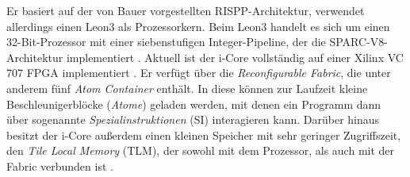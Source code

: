 Er basiert auf der von Bauer \cite{Bauer2009} vorgestellten RISPP-Architektur, verwendet allerdings einen Leon3 als Prozessorkern.
Beim Leon3 handelt es sich um einen 32-Bit-Prozessor mit einer siebenstufigen Integer-Pipeline, der die SPARC-V8-Architektur implementiert \cite{leon3}.
Aktuell ist der i-Core vollständig auf einer Xilinx VC 707 FPGA implementiert \cite{riedlberger2015}.
Er verfügt über die \textit{Reconfigurable Fabric}, die unter anderem fünf \textit{Atom Container} enthält.
In diese können zur Laufzeit kleine Beschleunigerblöcke (\textit{Atome}) geladen werden, mit denen ein Programm dann über
sogenannte \textit{Spezialinstruktionen} (SI) interagieren kann. Darüber hinaus besitzt der i-Core außerdem einen kleinen
Speicher mit sehr geringer Zugriffszeit, den \textit{Tile Local Memory} (TLM), der sowohl mit dem Prozessor, als auch mit der Fabric verbunden ist \cite{riedlberger2013}.

